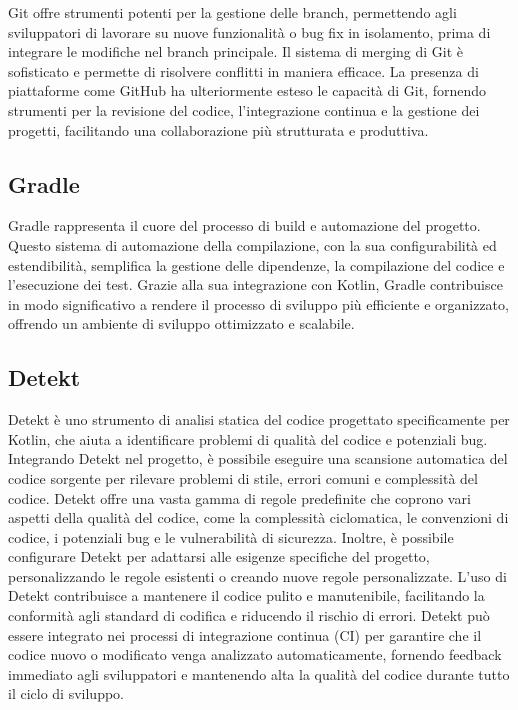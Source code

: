 \documentclass[12pt,a4paper,openright,twoside]{book}
\begin{document}
Git offre strumenti potenti per la gestione delle branch, permettendo agli sviluppatori di lavorare su nuove funzionalità o bug fix in isolamento, prima di integrare 
le modifiche nel branch principale. Il sistema di merging di Git è sofisticato e permette di risolvere conflitti in maniera efficace. La presenza di piattaforme come GitHub 
ha ulteriormente esteso le capacità di Git, fornendo strumenti per la revisione del codice, l'integrazione continua e la gestione dei progetti, facilitando una collaborazione 
più strutturata e produttiva.

\subsection{Gradle}

Gradle rappresenta il cuore del processo di build e automazione del progetto. Questo sistema di automazione della compilazione, con la sua configurabilità ed estendibilità, 
semplifica la gestione delle dipendenze, la compilazione del codice e l'esecuzione dei test. Grazie alla sua integrazione con Kotlin, Gradle contribuisce in modo significativo 
a rendere il processo di sviluppo più efficiente e organizzato, offrendo un ambiente di sviluppo ottimizzato e scalabile.

\subsection{Detekt}
Detekt è uno strumento di analisi statica del codice progettato specificamente per Kotlin, che aiuta a identificare problemi di qualità del codice e potenziali bug. 
Integrando Detekt nel progetto, è possibile eseguire una scansione automatica del codice sorgente per rilevare problemi di stile, errori comuni e complessità del codice.
Detekt offre una vasta gamma di regole predefinite che coprono vari aspetti della qualità del codice, come la complessità ciclomatica, le convenzioni di codice, i potenziali 
bug e le vulnerabilità di sicurezza. Inoltre, è possibile configurare Detekt per adattarsi alle esigenze specifiche del progetto, personalizzando le regole esistenti o creando 
nuove regole personalizzate.
L'uso di Detekt contribuisce a mantenere il codice pulito e manutenibile, facilitando la conformità agli standard di codifica e riducendo il rischio di errori. 
Detekt può essere integrato nei processi di integrazione continua (CI) per garantire che il codice nuovo o modificato venga analizzato automaticamente, fornendo feedback 
immediato agli sviluppatori e mantenendo alta la qualità del codice durante tutto il ciclo di sviluppo.
\end{document}
